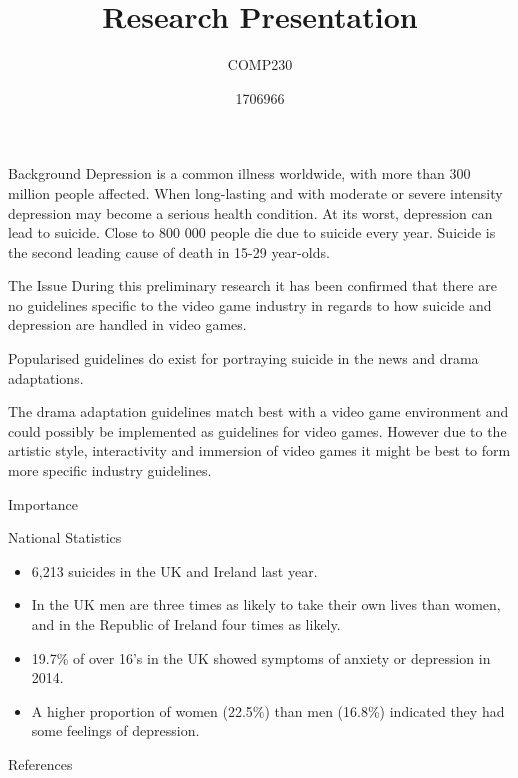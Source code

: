 \documentclass{beamer}
\title{Research Presentation}
\subtitle{COMP230}
\author{1706966}
\begin{document}
\begin{frame}
	\maketitle
\end{frame}

\begin{frame}{Background}
	Depression is a common illness worldwide, with more than 300 million people affected. When long-lasting and with moderate or severe intensity depression may become a serious health condition. At its worst, depression can lead to suicide. Close to 800 000 people die due to suicide every year. Suicide is the second leading cause of death in 15-29 year-olds\cite{DepressionStats}.
\end{frame}

\begin{frame}{The Issue}
	During this preliminary research it has been confirmed that there are no guidelines specific to the video game industry in regards to how suicide and depression are handled in video games.\vspace{5mm} %
	
	Popularised guidelines do exist for portraying suicide in the news\cite{world2017preventing}\cite{nepon2009media} and drama adaptations\cite{DramaGuidelines}. \vspace{5mm} %
	
	The drama adaptation guidelines match best with a video game environment and could possibly be implemented as guidelines for video games. However due to the artistic style, interactivity and immersion of video games it might be best to form more specific industry guidelines.   
\end{frame}

\begin{frame}{Importance}
	
\end{frame}

\begin{frame}{National Statistics}
		\begin{itemize}
		\item 6,213 suicides in the UK and Ireland last year\cite{death2018suicide}.
		\item In the UK men are three times as likely to take their own lives than women, and in the Republic of Ireland four times as likely\cite{death2018suicide}.
		\item 19.7\% of over 16's in the UK showed symptoms of anxiety or depression in 2014\cite{MentalStatistics}.
		\item A higher proportion of women (22.5\%) than men (16.8\%) indicated they had some feelings of depression\cite{MentalStatistics}.
	\end{itemize}
\end{frame}
\begin{frame}{References}
	
	
\end{frame}
\end{document}
